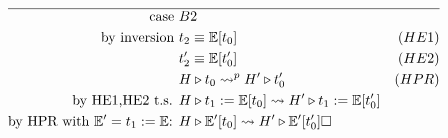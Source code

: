 \documentclass{article}
\begin{document}
\begin{enumerate}
\begin{align*}
            \hline
            \text{case } & B2 \\
            \text{by inversion } & t_2 \equiv \mathbb{E}[t_0] & (HE1) \\
                                 & t_2'\equiv \mathbb{E}[t_0'] & (HE2) \\
                                 & H\triangleright t_0 \leadsto^p H'\triangleright t_0' & (HPR) \\
            \text{by HE1,HE2 t.s. } & H\triangleright t_1:=\mathbb{E}[t_0] \leadsto H'\triangleright t_1:=\mathbb{E}[t_0'] \\
            \text{by HPR with $\mathbb{E}'=t_1:=\mathbb{E}$: } & H\triangleright\mathbb{E}'[t_0]\leadsto H'\triangleright \mathbb{E}'[t_0'] \square \\
        \end{align*}
\end{enumerate}

\newpage
\end{document}
